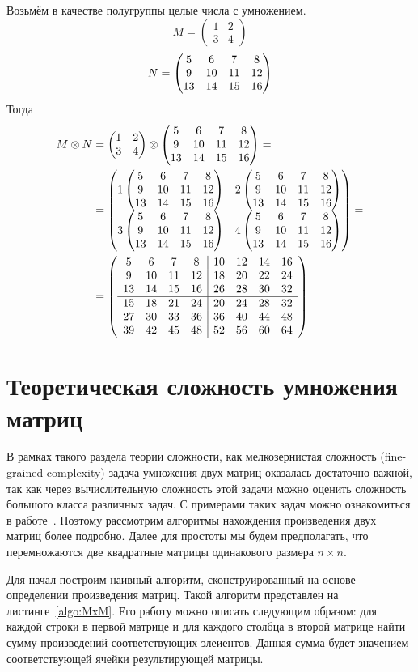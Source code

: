 \begin{example}
Возьмём в качестве полугруппы целые числа с умножением.
$$M=
\begin{pmatrix}
1 & 2 \\
3 & 4
\end{pmatrix}
$$
$$N=\begin{pmatrix} 5 & 6 & 7 & 8 \\ 9 & 10 & 11 & 12 \\ 13 & 14 & 15 & 16 \end{pmatrix}
$$
Тогда 
\begin{align}
M \otimes N & = 
\begin{pmatrix}
1 & 2 \\
3 & 4
\end{pmatrix}
\otimes
\begin{pmatrix} 5 & 6 & 7 & 8 \\ 9 & 10 & 11 & 12 \\ 13 & 14 & 15 & 16 \end{pmatrix} = \notag \\ &=
\begin{pmatrix}
1\begin{pmatrix} 5 & 6 & 7 & 8 \\ 9 & 10 & 11 & 12 \\ 13 & 14 & 15 & 16 \end{pmatrix} & 2\begin{pmatrix} 5 & 6 & 7 & 8 \\ 9 & 10 & 11 & 12 \\ 13 & 14 & 15 & 16 \end{pmatrix} \\
3\begin{pmatrix} 5 & 6 & 7 & 8 \\ 9 & 10 & 11 & 12 \\ 13 & 14 & 15 & 16 \end{pmatrix} & 4\begin{pmatrix} 5 & 6 & 7 & 8 \\ 9 & 10 & 11 & 12 \\ 13 & 14 & 15 & 16 \end{pmatrix}
\end{pmatrix}
=\notag \\
&=
\left(\begin{array}{c c c c | c c c c}
5  & 6  & 7  & 8  & 10 & 12 & 14 & 16 \\
9  & 10 & 11 & 12 & 18 & 20 & 22 & 24 \\
13 & 14 & 15 & 16 & 26 & 28 & 30 & 32 \\
\hline
15 & 18 & 21 & 24 & 20 & 24 & 28 & 32 \\
27 & 30 & 33 & 36 & 36 & 40 & 44 & 48 \\
39 & 42 & 45 & 48 & 52 & 56 & 60 & 64 
\end{array}\right)
\end{align}
\end{example}


\section{Теоретическая сложность умножения матриц}

В рамках такого раздела теории сложности, как мелкозернистая сложность (fine-grained complexity) задача умножения двух матриц оказалась достаточно важной, так как через вычислительную сложность этой задачи можно оценить сложность большого класса различных задач. С примерами таких задач можно ознакомиться в работе~\cite{Williams:2010:SEP:1917827.1918339}. Поэтому рассмотрим алгоритмы нахождения произведения двух матриц более подробно. Далее для простоты мы будем предполагать, что перемножаются две квадратные матрицы одинакового размера $n \times n$.

Для начал построим наивный алгоритм, сконструированный на основе определении произведения матриц. Такой алгоритм представлен на листинге~\ref{algo:MxM}. Его работу можно описать следующим образом: для каждой строки в первой матрице и для каждого столбца в второй матрице найти сумму произведений соответствующих элеиентов. Данная сумма будет значением соответствующей ячейки результирующей матрицы.

